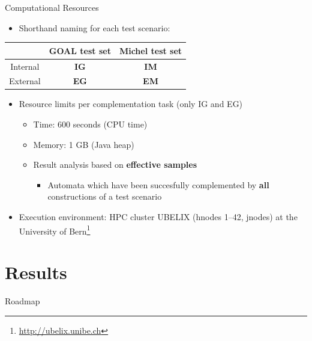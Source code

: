 \documentclass[12pt]{beamer}
\newcommand{\fat}[1]{\textbf{#1}}
\newcommand{\tocstyle}[1]{
\Large
\vspace{0.25cm}
\hspace{0.5cm}
\parbox[top][0.66\textheight][c]{0.66\textwidth}{#1}}
\begin{document}
\begin{frame}{Computational Resources}
\vspace{-1mm}
\begin{itemize}
\item Shorthand naming for each test scenario:
\end{itemize}
\vspace{1pt}
\centering
{\footnotesize
\renewcommand{\arraystretch}{1.2}
\begin{tabular}{c|c|c}
         & GOAL test set & Michel test set \\ \hline
Internal & \fat{IG}      & \fat{IM}        \\ \hline
External & \fat{EG}      & \fat{EM}        \\
\end{tabular}}
\pause
\vspace{6pt}
\begin{itemize}\itemsep3pt
\item Resource limits per complementation task (only IG and EG)
  \begin{itemize}\itemsep2pt
  \item Time:   \tabto{1.6cm} 600 seconds (CPU time)
  \item Memory: \tabto{1.6cm} 1 GB (Java heap)
  \pause
  \item Result analysis based on \fat{effective samples}
    \begin{itemize}
    \item Automata which have been succesfully complemented by \fat{all} constructions of a test scenario
    \end{itemize}
  \end{itemize}
\pause
\item Execution environment: HPC cluster UBELIX (hnodes 1--42, jnodes) at the University of Bern\footnote{\url{http://ubelix.unibe.ch}}
\end{itemize}
\end{frame}


\section{Results}
\begin{frame}{Roadmap}
\tocstyle{\tableofcontents[currentsection]}
\end{frame}
\end{document}
